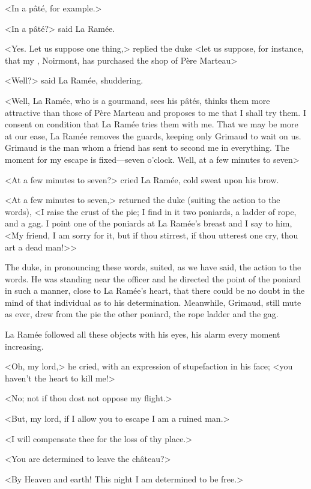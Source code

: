 <In a pâté, for example.>

<In a pâté?> said La Ramée.

<Yes. Let us suppose one thing,> replied the duke <let us suppose, for instance, that my , Noirmont, has purchased the shop of Père Marteau\longdash>

<Well?> said La Ramée, shuddering.

<Well, La Ramée, who is a gourmand, sees his pâtés, thinks them more attractive than those of Père Marteau and proposes to me that I shall try them. I consent on condition that La Ramée tries them with me. That we may be more at our ease, La Ramée removes the guards, keeping only Grimaud to wait on us. Grimaud is the man whom a friend has sent to second me in everything. The moment for my escape is fixed—seven o'clock. Well, at a few minutes to seven\longdash>

<At a few minutes to seven?> cried La Ramée, cold sweat upon his brow.

<At a few minutes to seven,> returned the duke (suiting the action to the words), <I raise the crust of the pie; I find in it two poniards, a ladder of rope, and a gag. I point one of the poniards at La Ramée's breast and I say to him, <My friend, I am sorry for it, but if thou stirrest, if thou utterest one cry, thou art a dead man!>>

The duke, in pronouncing these words, suited, as we have said, the action to the words. He was standing near the officer and he directed the point of the poniard in such a manner, close to La Ramée's heart, that there could be no doubt in the mind of that individual as to his determination. Meanwhile, Grimaud, still mute as ever, drew from the pie the other poniard, the rope ladder and the gag.

La Ramée followed all these objects with his eyes, his alarm every moment increasing.

<Oh, my lord,> he cried, with an expression of stupefaction in his face; <you haven't the heart to kill me!>

<No; not if thou dost not oppose my flight.>

<But, my lord, if I allow you to escape I am a ruined man.>

<I will compensate thee for the loss of thy place.>

<You are determined to leave the château?>

<By Heaven and earth! This night I am determined to be free.>

